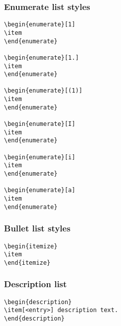 \documentclass[AMS,STIX1COL]{WileyNJD-v2}
\begin{document}
\subsubsection{Enumerate list styles}
\begin{verbatim}
\begin{enumerate}[1]
\item 
\end{enumerate}

\begin{enumerate}[1.]
\item 
\end{enumerate}

\begin{enumerate}[(1)]
\item 
\end{enumerate}

\begin{enumerate}[I]
\item 
\end{enumerate}

\begin{enumerate}[i]
\item 
\end{enumerate}

\begin{enumerate}[a]
\item 
\end{enumerate}

\end{verbatim}

\subsubsection{Bullet list styles}

\begin{verbatim}
\begin{itemize}
\item 
\end{itemize}
\end{verbatim}

\subsubsection{Description list}

\begin{verbatim}
\begin{description}
\item[<entry>] description text.
\end{description}
\end{verbatim}
\end{document}
